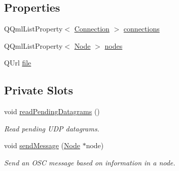 \subsection*{Properties}
\begin{DoxyCompactItemize}
\item 
Q\+Qml\+List\+Property$<$ \mbox{\hyperlink{classConnection}{Connection}} $>$ \mbox{\hyperlink{classRoom_a393b843ae2ef099ee92633a17f560ec8}{connections}}
\item 
Q\+Qml\+List\+Property$<$ \mbox{\hyperlink{classNode}{Node}} $>$ \mbox{\hyperlink{classRoom_a775521f64541cbe3a8ae8a37a008a3c2}{nodes}}
\item 
Q\+Url \mbox{\hyperlink{classRoom_a13e2ceb7b9470a01114bb50890b41ab7}{file}}
\end{DoxyCompactItemize}
\subsection*{Private Slots}
\begin{DoxyCompactItemize}
\item 
\mbox{\label{classRoom_af50ca900545ad2f106ef15f984424b44}} 
void \mbox{\hyperlink{classRoom_af50ca900545ad2f106ef15f984424b44}{read\+Pending\+Datagrams}} ()
\begin{DoxyCompactList}\small\item\em Read pending U\+DP datagrams. \end{DoxyCompactList}\item 
void \mbox{\hyperlink{classRoom_a3abfcc9def908c1a0acaf286fc325454}{send\+Message}} (\mbox{\hyperlink{classNode}{Node}} $\ast$node)
\begin{DoxyCompactList}\small\item\em Send an O\+SC message based on information in a node. \end{DoxyCompactList}\end{DoxyCompactItemize}
